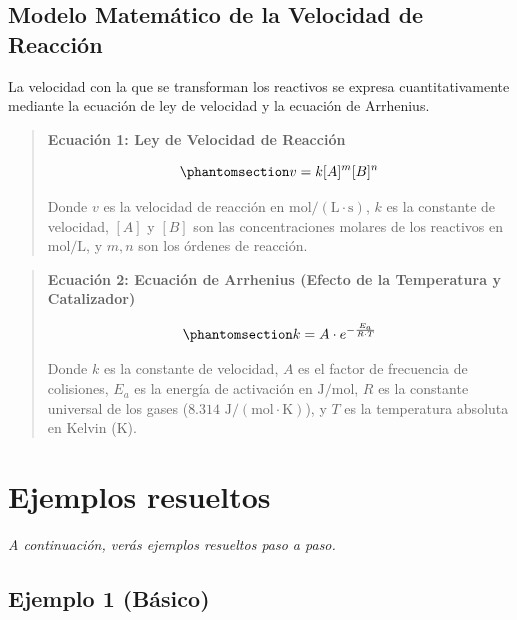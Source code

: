 \documentclass[
  spanish,
  letterpaper,
  12pt,
  oneside,
  open=any,
  DIV=15]{scrbook}
\newcommand{\setcolorsection}[2]{%
  \definecolor{currentsectionbg}{HTML}{#1}%
  \definecolor{currentsectionborder}{HTML}{#2}%
}
\begin{document}
\begin{tcolorbox}
\subsection{Modelo Matemático de la Velocidad de
Reacción}\label{modelo-matemuxe1tico-de-la-velocidad-de-reacciuxf3n}

La velocidad con la que se transforman los reactivos se expresa
cuantitativamente mediante la ecuación de ley de velocidad y la ecuación
de Arrhenius.

\begin{quote}
\textbf{Ecuación 1: Ley de Velocidad de Reacción}

\begin{equation}\protect\phantomsection\label{eq-ley-velocidad}{
v = k [A]^m [B]^n
}\end{equation}

Donde \(v\) es la velocidad de reacción en
\(\text{mol}/(\text{L} \cdot \text{s})\), \(k\) es la constante de
velocidad, \([A]\) y \([B]\) son las concentraciones molares de los
reactivos en \(\text{mol}/\text{L}\), y \(m, n\) son los órdenes de
reacción.
\end{quote}

\begin{quote}
\textbf{Ecuación 2: Ecuación de Arrhenius (Efecto de la Temperatura y
Catalizador)}

\begin{equation}\protect\phantomsection\label{eq-arrhenius}{
k = A \cdot e^{-\frac{E_a}{R \cdot T}}
}\end{equation}

Donde \(k\) es la constante de velocidad, \(A\) es el factor de
frecuencia de colisiones, \(E_a\) es la energía de activación en
\(\text{J}/\text{mol}\), \(R\) es la constante universal de los gases
(\(8.314 \text{ J}/(\text{mol} \cdot \text{K})\)), y \(T\) es la
temperatura absoluta en Kelvin (\(\text{K}\)).
\end{quote}

\setcolorsection{b3d9f0}{94c4e0}

\section{Ejemplos resueltos}\label{ejemplos-resueltos-7}

\emph{A continuación, verás ejemplos resueltos paso a paso.}

\subsection{Ejemplo 1 (Básico)}\label{ejemplo-1-buxe1sico-7}


\end{tcolorbox}
\end{document}
